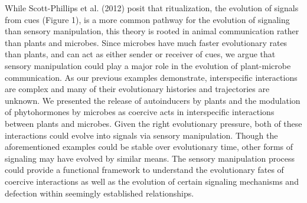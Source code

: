 While Scott-Phillips et al. (2012) posit that ritualization, the evolution of signals from cues (Figure 1), is a more common pathway for the evolution of signaling than sensory manipulation, this theory is rooted in animal communication rather than plants and microbes. Since microbes have much faster evolutionary rates than plants, and can act as either sender or receiver of cues, we argue that sensory manipulation could play a major role in the evolution of plant-microbe communication. As our previous examples demonstrate, interspecific interactions are complex and many of their evolutionary histories and trajectories are unknown. We presented the release of autoinducers by plants and the modulation of phytohormones by microbes as coercive acts in interspecific interactions between plants and microbes. Given the right evolutionary pressure, both of these interactions could evolve into signals via sensory manipulation. Though the aforementioned examples could be stable over evolutionary time, other forms of signaling may have evolved by similar means. The sensory manipulation process could provide a functional framework to understand the evolutionary fates of coercive interactions as well as the evolution of certain signaling mechanisms and defection within seemingly established relationships.

